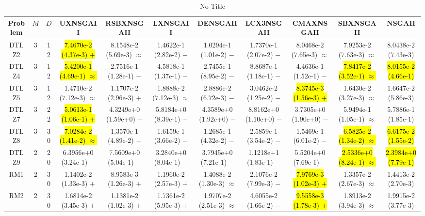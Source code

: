 \documentclass[journal]{IEEEtran}
\begin{document}
\begin{table*}[htbp]
\renewcommand{\arraystretch}{1.2}
\centering
\caption{No Title}
\begin{tabular}{ccccccccccc}
\toprule
Problem&$M$&$D$&UXNSGAII&RSBXNSGAII&LXNSGAII&DENSGAII&LCX3NSGAII&CMAXNSGAII&SBXNSGAII&NSGAII\\
\midrule
\multirow{1}{*}{DTLZ2}&3&12&\hl{7.4670e-2 (4.37e-3) $+$}&8.1548e-2 (5.69e-3) $\approx$&1.4622e-1 (2.82e-2) $-$&1.0294e-1 (1.01e-2) $-$&1.7370e-1 (2.07e-2) $-$&8.0468e-2 (7.65e-3) $\approx$&7.9253e-2 (7.63e-3) $\approx$&8.0438e-2 (7.43e-3)\\
\hline
\multirow{1}{*}{DTLZ4}&3&12&\hl{5.4200e-1 (4.69e-1) $\approx$}&2.7516e-1 (1.28e-1) $-$&4.5818e-1 (1.37e-1) $-$&2.7455e-1 (8.95e-2) $-$&8.8687e-1 (1.18e-1) $-$&4.4636e-1 (1.52e-1) $-$&\hl{7.8417e-2 (3.52e-1) $\approx$}&\hl{8.0155e-2 (4.66e-1)}\\
\hline
\multirow{1}{*}{DTLZ5}&3&12&1.4710e-2 (7.12e-3) $\approx$&1.1707e-2 (2.96e-3) $+$&1.8888e-2 (7.12e-3) $\approx$&2.8886e-2 (6.72e-3) $-$&3.0462e-2 (1.25e-2) $-$&\hl{8.3745e-3 (1.56e-3) $+$}&1.6430e-2 (3.27e-3) $\approx$&1.6647e-2 (5.86e-3)\\
\hline
\multirow{1}{*}{DTLZ7}&3&22&\hl{5.0613e-1 (1.06e-1) $+$}&4.3249e+0 (1.59e+0) $-$&5.8184e+0 (8.39e-1) $-$&4.3589e+0 (1.92e+0) $-$&8.8162e+0 (1.10e+0) $-$&3.7305e+0 (1.90e+0) $-$&5.9494e-1 (1.05e-1) $\approx$&5.7886e-1 (1.85e-1)\\
\hline
\multirow{1}{*}{DTLZ8}&3&30&\hl{7.0284e-2 (1.41e-2) $\approx$}&1.3570e-1 (4.89e-2) $-$&1.6159e-1 (3.66e-2) $-$&1.2685e-1 (4.32e-2) $-$&2.5859e-1 (3.54e-2) $-$&1.5469e-1 (6.01e-2) $-$&\hl{6.5825e-2 (1.34e-2) $\approx$}&\hl{6.6175e-2 (1.55e-2)}\\
\hline
\multirow{1}{*}{DTLZ9}&2&20&6.3956e+0 (3.24e-1) $-$&7.5609e+0 (5.04e-1) $-$&3.2840e+0 (8.04e-1) $-$&3.7945e+0 (7.21e-1) $-$&1.1218e+1 (1.83e-1) $-$&5.5204e+0 (7.69e-1) $-$&\hl{2.5336e+0 (8.24e-1) $\approx$}&\hl{2.3984e+0 (7.79e-1)}\\
\hline
\multirow{1}{*}{RM1}&2&30&1.1402e-2 (1.33e-3) $+$&8.9583e-3 (1.26e-3) $+$&1.1960e-2 (2.57e-3) $+$&1.4088e-2 (1.30e-3) $\approx$&2.1076e-2 (7.99e-3) $-$&\hl{7.9769e-3 (1.02e-3) $+$}&1.3357e-2 (2.67e-3) $\approx$&1.4413e-2 (2.70e-3)\\
\hline
\multirow{1}{*}{RM2}&2&30&1.6814e-2 (3.45e-3) $+$&1.1381e-2 (1.02e-3) $+$&1.7361e-2 (5.95e-3) $+$&1.9707e-2 (2.51e-3) $\approx$&4.6055e-2 (1.66e-2) $-$&\hl{9.5558e-3 (1.78e-3) $+$}&1.8913e-2 (3.94e-3) $\approx$&1.9915e-2 (3.77e-3)\\

\end{tabular}
\end{table*}
\end{document}
